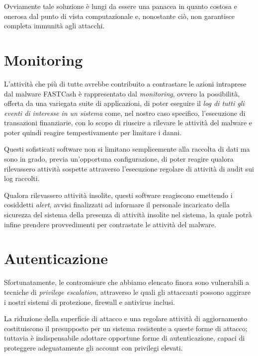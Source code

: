\documentclass[10pt,a4paper, titlepage]{report}
\begin{document}
Ovviamente tale soluzione è lungi da essere una panacea in quanto costosa e onerosa dal punto di vista computazionale e, nonostante ciò, non garantisce completa immunità agli attacchi.

\section{Monitoring}

L'attività che più di tutte avrebbe contribuito a contrastare le azioni intraprese dal malware FASTCash è rappresentato dal \textit{monitoring}, ovvero la possibilità, offerta da una variegata suite di applicazioni, di poter eseguire il \textit{log di tutti gli eventi di interesse in un sistema} come, nel nostro caso specifico, l'esecuzione di transazioni finanziarie, con lo scopo di riuscire a rilevare le attività del malware e poter quindi reagire tempestivamente per limitare i danni.

Questi sofisticati software non si limitano semplicemente alla raccolta di dati ma sono in grado, previa un'opportuna configurazione, di poter reagire qualora rilevassero attività sospette attraverso l'esecuzione regolare di attività di audit sui log raccolti. 

Qualora rilevassero attività insolite, questi software reagiscono emettendo i cosiddetti \textit{alert}, avvisi finalizzati ad informare il personale incaricato della sicurezza del sistema della presenza di attività insolite nel sistema, la quale potrà infine prendere provvedimenti per contrastate le attività del malware.

\section{Autenticazione}

Sfortunatamente, le contromisure che abbiamo elencato finora sono vulnerabili a tecniche di \textit{privilege escalation}, attraverso le quali gli attaccanti possono aggirare i nostri sistemi di protezione, firewall e antivirus inclusi.

La riduzione della superficie di attacco e una regolare attività di aggiornamento costituiscono il presupposto per un sistema resistente a queste forme di attacco; tuttavia è indispensabile adottare opportune forme di autenticazione, capaci di proteggere adeguatamente gli account con privilegi elevati.
\end{document}
